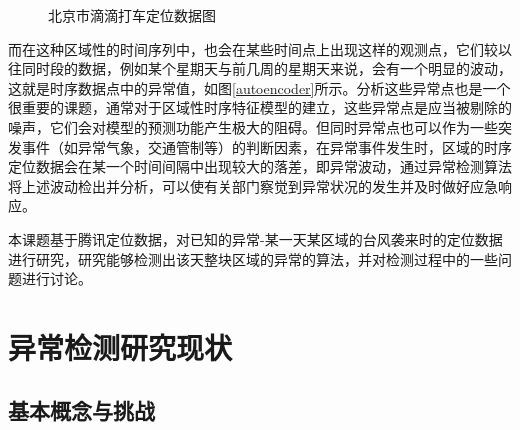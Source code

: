 \documentclass[a4paper,AutoFakeBold,oneside,12pt]{book}
\begin{document}
\begin{figure}[!htbp]
    \centering
    \quad %
    \caption{北京市滴滴打车定位数据图} %
    \label{Fig:didi} %
\end{figure}
	而在这种区域性的时间序列中，也会在某些时间点上出现这样的观测点，它们较以往同时段的数据，例如某个星期天与前几周的星期天来说，会有一个明显的波动，这就是时序数据点中的异常值，如图\ref{autoencoder}所示。分析这些异常点也是一个很重要的课题，通常对于区域性时序特征模型的建立，这些异常点是应当被剔除的噪声，它们会对模型的预测功能产生极大的阻碍。但同时异常点也可以作为一些突发事件（如异常气象，交通管制等）的判断因素，在异常事件发生时，区域的时序定位数据会在某一个时间间隔中出现较大的落差，即异常波动，通过异常检测算法将上述波动检出并分析，可以使有关部门察觉到异常状况的发生并及时做好应急响应。


	本课题基于腾讯定位数据，对已知的异常-某一天某区域的台风袭来时的定位数据进行研究，研究能够检测出该天整块区域的异常的算法，并对检测过程中的一些问题进行讨论。

\section{异常检测研究现状}

\subsection{基本概念与挑战}
\end{document}
